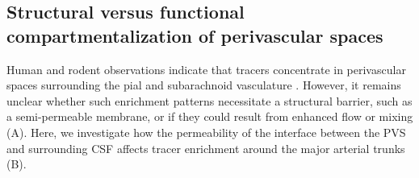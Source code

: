 \documentclass[fleqn,10pt]{wlscirep}
\newcommand{\mer}[1]{\textcolor{magenta}{#1}}
\begin{document}


\subsection*{Structural versus functional compartmentalization of perivascular spaces}

Human and rodent observations indicate that tracers concentrate in perivascular spaces surrounding the pial and subarachnoid vasculature \cite{zhang1990interrelationships,zhang1992directional,eide2024functional, mestre2018flow}. However, it remains unclear whether such enrichment patterns necessitate a structural barrier, such as a semi-permeable membrane, or if they could result from enhanced flow or mixing (A). Here, we investigate how the permeability of the interface between the PVS and surrounding CSF affects tracer enrichment around the major arterial trunks (B).
\end{document}
